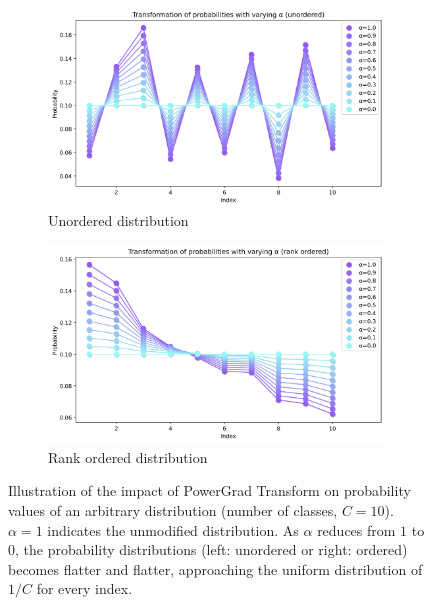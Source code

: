\documentclass[times,sort&compress]{elsarticle}
\begin{document}
\begin{figure}[t]
\centering
\begin{subfigure}{.5\textwidth}
\centering
\includegraphics[width=0.98\textwidth]{prob_transform_unordered}
\caption{Unordered distribution}
\end{subfigure}%
\begin{subfigure}{.5\textwidth}
\centering
\includegraphics[width=0.98\textwidth]{prob_transform_ordered}
\caption{Rank ordered distribution}
\end{subfigure}
\caption{ Illustration of the impact of PowerGrad Transform on probability values of an
arbitrary distribution (number of classes, $C=10$). $\alpha=1$ indicates the unmodified
distribution. As $\alpha$ reduces from $1$ to $0$, the probability distributions (left:
unordered or right: ordered) becomes flatter and flatter, approaching the uniform
distribution of $1/C$ for every index. }
\label{fig:prob_plots}
\end{figure}
\end{document}
